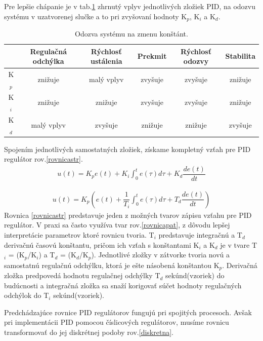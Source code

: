 Pre lepšie chápanie je v tab.\ref{PIDvplyv}\cite{pidcontrol} zhrnutý vplyv jednotlivých zložiek PID, na odozvu systému v uzatvorenej slučke a to pri zvyšovaní hodnoty K$_p$, K$_i$ a K$_d$. 

\begin{table}[!tbh]
	\begin{tabular}{|c|c|c|c|c|c|}
		\hline
		& Regulačná odchýlka & Rýchlosť ustálenia & Prekmit & Rýchlosť odozvy & Stabilita \\ \hline
		K$_p$                    & znižuje            & malý vplyv         & zvyšuje      & zvyšuje         & znižuje           \\ \hline
		K$_i$                    & znižuje            & znižuje            & zvyšuje      & zvyšuje         & znižuje           \\ \hline
		K$_d$                    & malý vplyv         & zvyšuje            & znižuje      & znižuje         & zvyšuje           \\ \hline
	\end{tabular}
	\caption{Odozva systému na zmenu konštánt.}
	\label{PIDvplyv}
\end{table}

Spojením jednotlivých samostatných zložiek, získame kompletný vzťah pre PID regulátor rov.\ref{rovnicastr}.
\begin{align}
	\label{rovnicastr}
	u(t)=K_p e(t) + K_i  \int_{0}^{t} e(\tau)d\tau + K_d  \dfrac{de(t)}{dt}
\end{align}

\begin{align}
	\label{rovnicapat}
	u(t)=K_p \left(e(t) + \dfrac{1}{T_i}  \int_{0}^{t} e(\tau)d\tau + T_d  \dfrac{de(t)}{dt}\right)
\end{align}
Rovnica \ref{rovnicastr} predstavuje jeden z možných tvarov zápisu vzťahu pre PID regulátor. V praxi sa často využíva tvar rov.\ref{rovnicapat}, z dôvodu lepšej interpretácie parametrov ktoré rovnicu tvoria. T$_i$ predstavuje integračnú a T$_d$ derivačnú časovú konštantu, pričom ich vzťah s konštantami K$_i$ a K$_d$ je v tvare T$_i$ = (K$_p$/K$_i$) a T$_d$ = (K$_d$/K$_p$). Jednotlivé zložky v zátvorke tvoria novú a samostatnú regulačnú odchýlku, ktorá je ešte násobená konštantou K$_p$. Derivačná zložka predpovedá hodnotu regulačnej odchýlky T$_d$ sekúnd(vzoriek) do budúcnosti a integračná zložka sa snaží korigovať súčet hodnoty regulačných odchýlok do T$_i$ sekúnd(vzoriek)\cite{pidcontrol}.

Predchádzajúce rovnice PID regulátorov fungujú pri spojitých procesoch. Avšak pri implementácii PID pomocou číslicových regulátorov, musíme rovnicu transformovať do jej diskrétnej podoby rov.\ref{diskretna}.

